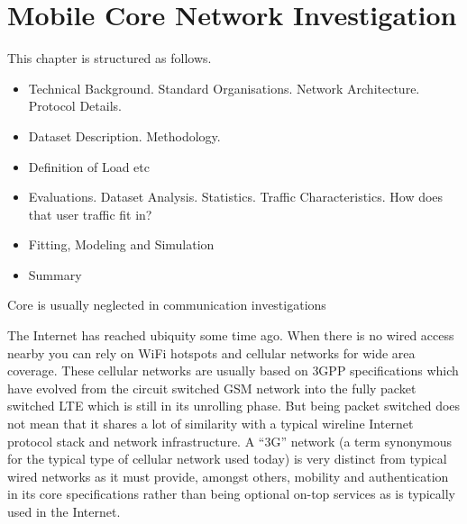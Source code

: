 \chapter{Mobile Core Network Investigation}
\label{chap:mobilenets}


This chapter is structured as follows.

\begin{itemize}
	\item Technical Background. Standard Organisations. Network Architecture. Protocol Details.
	\item Dataset Description. Methodology.
	\item Definition of Load etc
	\item Evaluations. Dataset Analysis. Statistics. Traffic Characteristics. How does that user traffic fit in?
	\item Fitting, Modeling and Simulation
	\item Summary
\end{itemize}



Core is usually neglected in communication investigations


The Internet has reached ubiquity some time ago. When there is no wired access nearby you can rely on WiFi hotspots and cellular networks for wide area coverage. These cellular networks are usually based on \gls{3GPP} specifications which have evolved from the circuit switched \gls{GSM} network into the fully packet switched \gls{LTE} which is still in its unrolling phase. But being packet switched does not mean that it shares a lot of similarity with a typical wireline Internet protocol stack and network infrastructure. A ``3G'' network (a term synonymous for the typical type of cellular network used today) is very distinct from typical wired networks as it must provide, amongst others, mobility and authentication in its core specifications rather than being optional on-top services as is typically used in the Internet.

